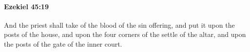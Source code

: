 
		\paragraph{Ezekiel 45:19} %
			\label{EZEKIEL-45-19}

			And the priest shall take of the blood of the sin offering, and put it upon the posts of the house, and upon the four corners of the settle of the altar, and upon the posts of the gate of the inner court.


